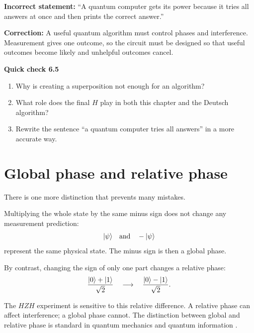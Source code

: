 \begin{misconception}
\textbf{Incorrect statement:} ``A quantum computer gets its power because it tries all answers at once and then prints the correct answer.''

\medskip
\textbf{Correction:} A useful quantum algorithm must control phases and interference. Measurement gives one outcome, so the circuit must be designed so that useful outcomes become likely and unhelpful outcomes cancel.
\end{misconception}

\begin{checkpoint}
\textbf{Quick check 6.5}
\begin{enumerate}
  \item Why is creating a superposition not enough for an algorithm?
  \item What role does the final $H$ play in both this chapter and the Deutsch algorithm?
  \item Rewrite the sentence ``a quantum computer tries all answers'' in a more accurate way.
\end{enumerate}
\end{checkpoint}

\section{Global phase and relative phase}
\label{sec:ch06-global-relative-phase}

There is one more distinction that prevents many mistakes.

Multiplying the whole state by the same minus sign does not change any measurement prediction:
\begin{equation}
\lvert \psi\rangle\quad\text{and}\quad -\lvert \psi\rangle
\end{equation}
represent the same physical state. The minus sign is then a global phase.

By contrast, changing the sign of only one part changes a relative phase:
\begin{equation}
\frac{\lvert 0\rangle+\lvert 1\rangle}{\sqrt{2}}
\quad\longrightarrow\quad
\frac{\lvert 0\rangle-\lvert 1\rangle}{\sqrt{2}}.
\end{equation}

The $H Z H$ experiment is sensitive to this relative difference. A relative phase can affect interference; a global phase cannot. The distinction between global and relative phase is standard in quantum mechanics and quantum information \citep{nielsenChuang2010,mermin2007quantumComputerScience}.

